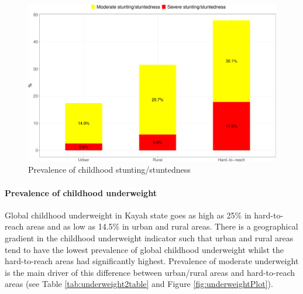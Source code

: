 \documentclass[12pt,a4paper]{article}
\let\oldparagraph\paragraph
\renewcommand{\paragraph}[1]{\oldparagraph{#1}\mbox{}}
\begin{document}
\begin{figure}[H]

{\centering \includegraphics{kayahReport_files/figure-latex/stuntPlot-1} 

}

\caption{Prevalence of childhood stunting/stuntedness}\label{fig:stuntPlot}
\end{figure}

\hypertarget{underweight}{%
\paragraph{Prevalence of childhood underweight}\label{underweight}}

Global childhood underweight in Kayah state goes as high as 25\% in hard-to-reach areas and as low as 14.5\% in urban and rural areas. There is a geographical gradient in the childhood underweight indicator such that urban and rural areas tend to have the lowest prevalence of global childhood underweight whilst the hard-to-reach areas had significantly highest. Prevalence of moderate underweight is the main driver of this difference between urban/rural areas and hard-to-reach areas (see Table \ref{tab:underweight2table} and Figure \ref{fig:underweightPlot}).
\end{document}
